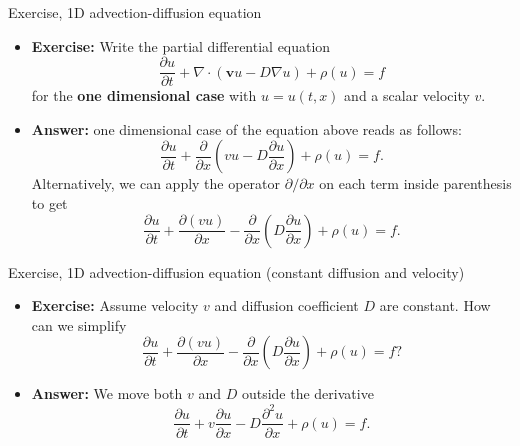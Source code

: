 %
\begin{frame}{Exercise, 1D advection-diffusion equation}
\begin{itemize}
\item \alert{\textbf{Exercise:}} Write the partial differential equation
\[
\frac{\partial u}{\partial t}+\nabla\cdot(\boldsymbol{v}u-D\nabla u)  + \rho (u) =f
\]
for the \textbf{one dimensional case} with $u=u(t,x)$ and a scalar velocity $v$. 
\hiddenpause
\item \textbf{Answer:} one dimensional case of the equation above reads as follows:
%
\[
\frac{\partial u}{\partial t}+\frac{\partial}{\partial x}\left(vu-D\frac{\partial u}{\partial x}\right)  + \rho (u) =f.
\]
Alternatively, we can apply the operator $\partial/\partial x$ on
each term inside parenthesis to get 
\[
\frac{\partial u}{\partial t}+\frac{\partial(vu)}{\partial x}-\frac{\partial}{\partial x}\left(D\frac{\partial u}{\partial x}\right)  + \rho (u) = f.
\]
\end{itemize}
\end{frame}
%
%
\begin{frame}{Exercise, 1D advection-diffusion equation (constant diffusion and velocity)}
\begin{itemize}
\item \alert{\textbf{Exercise:}} Assume velocity $v$ and diffusion coefficient
$D$ are constant. How can we simplify
\[
\frac{\partial u}{\partial t}+\frac{\partial(vu)}{\partial x}-\frac{\partial}{\partial x}\left(D\frac{\partial u}{\partial x}\right)+ \rho (u) =f?
\]
\hiddenpause
\item \textbf{Answer:} We move both $v$ and $D$ outside the derivative
\[
\frac{\partial u}{\partial t}+v\frac{\partial u}{\partial x}-D\frac{\partial^{2}u}{\partial x}+ \rho (u) =f.
\]
\end{itemize}
\end{frame}
%
